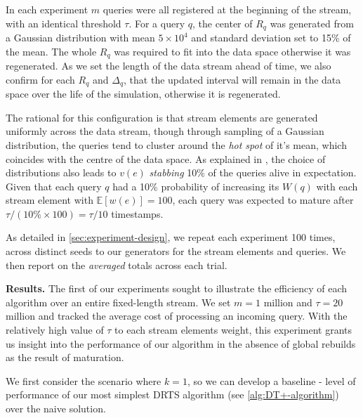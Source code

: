 In each experiment $m$ queries were all registered at the beginning of the stream, with an identical threshold $\tau$. For a query $q$, the center of $R_q$ was generated from a Gaussian distribution with mean $5\times10^4$ and standard deviation set to 15\% of the mean. The whole $R_q$ was required to fit into the data space otherwise it was regenerated. As we set  the length of the data stream ahead of time, we also confirm for each $R_q$ and $\Delta_q$, that the updated interval will remain in the data space over the life of the simulation, otherwise it is regenerated.  

The rational for this configuration is that stream elements are generated uniformly across the data stream, though through sampling of a Gaussian distribution, the queries tend to cluster around the \textit{hot spot}  of it's mean, which coincides with the centre of the data space. As explained in \cite{GAN16}, the choice of distributions also leads to $v(e)$ \textit{stabbing} 10\% of the queries alive in expectation. Given that each query $q$ had a 10\% probability of increasing its $W(q)$ with each stream element with $\mathbb{E}[w(e)] = 100$, each query was expected to mature after $\tau / (10\% \times 100) = \tau/10$ timestamps. 

As detailed in \cref{sec:experiment-design}, we repeat each experiment 100 times, across distinct seeds to our generators for the stream elements and queries. We then report on the \textit{averaged} totals across each trial.

\textbf{Results.} The first of our experiments sought to illustrate the efficiency of each algorithm over an entire fixed-length stream. We set $m = 1$ million and $\tau = 20$ million and tracked the average cost of processing an incoming query. With the relatively high value of $\tau$ to each stream elements weight, this experiment grants us insight into the performance of our algorithm in the absence of global rebuilds as the result of maturation. 

We first consider the scenario where $k=1$, so we can develop a baseline - level of performance of our most simplest DRTS algorithm (see \cref{alg:DT+-algorithm}) over the naive solution.

